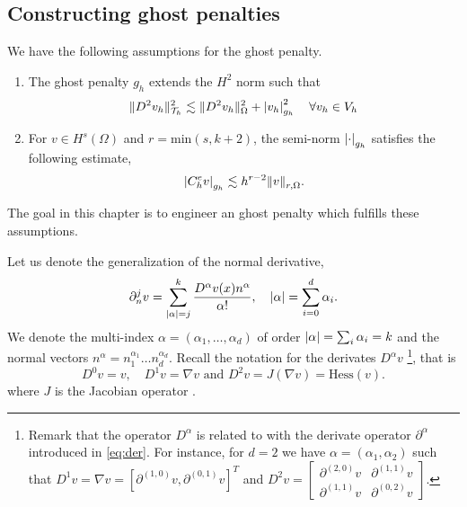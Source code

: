 
\subsection{Constructing ghost penalties}%
\label{sec:constructing_ghost_penalties}

We have the following assumptions for the ghost penalty.
\begin{enumerate}[label=\textbf{EP\arabic*}]
    \item \label{as:EP1} The ghost penalty $g_{h}$ extends the $H^{2}$ norm such that
        \begin{equation}
    \| D^2v_{h} \|_{ \mathcal{T} _{h} }^{ 2 }  \lesssim \| D^2 v_{h} \|_{ \Omega  }^{  2} + \left\lvert  v_{h}  \right\rvert _{g_{h}}^2 \quad \forall v_{h} \in V_{h}
        \end{equation}
\item \label{as:EP2} For $v \in H^{s}( \Omega ) $ and $r = \mathrm{ min} (s,k+2) $, the semi-norm $\left\lvert  \cdot   \right\rvert_{g_{h}} $ satisfies the following estimate,
    \begin{equation}
    \left\lvert  C _{h}^{e} v  \right\rvert _{g_{h}} \lesssim  h^{r-2} \| v \|_{ r,\Omega  }^{  }.
    \end{equation}
\end{enumerate}
The goal in this chapter is to engineer an ghost penalty which fulfills these assumptions.

Let us denote the generalization of the normal derivative,
\begin{equation}
\partial _{n}^{j} v = \sum_{\left\lvert  \alpha   \right\rvert =j }^{k} \frac{D ^{\alpha }v( x) n^{\alpha }}{\alpha !}, \quad \left\lvert  \alpha   \right\rvert = \sum_{i=0}^{d} \alpha_{i}.
\end{equation}
We denote the multi-index $\alpha  = ( \alpha _{1}, \ldots, \alpha _{d})  $ of order $\left\lvert  \alpha   \right\rvert = \sum_{i}^{}  \alpha _{i} = k $   and the normal vectors $n^{\alpha } = n_{1}^{\alpha _{1}} \ldots n_{d}^{\alpha _{d}}$.
Recall the notation for the derivates $D^{\alpha } v$
\footnote{
Remark that the operator $D^{\alpha }$  is related to with the derivate operator $\partial ^{\alpha } $ introduced in \eqref{eq:der}. For instance, for $d=2$ we have $\alpha = ( \alpha _{1}, \alpha _{2}) $  such that $ D^{1} v =  \nabla v  = \left[ \partial ^{( 1,0 )} v,\partial ^{( 0,1 )}v
\right]^{T}$ and $   D^2 v  = \begin{bmatrix}
\partial ^{( 2,0 )} v &  \partial ^{( 1,1) }v \\
\partial ^{( 1,1 )} v &  \partial ^{( 0,2) }v
\end{bmatrix}
 $.
},
that is
\begin{equation}
D ^{0} v  = v, \quad   D ^{1}v  = \nabla v \text{ and }  D ^{2} v  = J(\nabla v) = \mathrm{Hess}(v).
\end{equation}
where $J$ is the Jacobian operator .


